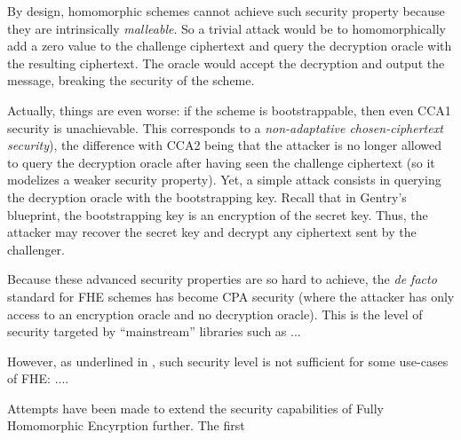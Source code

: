 By design, homomorphic schemes cannot achieve such security property because they are intrinsically \textit{malleable}. So a trivial attack would be to homomorphically add a zero value to the challenge ciphertext and query the decryption oracle with the resulting ciphertext. The oracle would accept the decryption and output the message, breaking the security of the scheme.

Actually, things are even worse: if the scheme is bootstrappable, then even \textsf{CCA1} security is unachievable. This corresponds to a \textit{non-adaptative chosen-ciphertext security}), the difference with \textsf{CCA2} being that the attacker is no longer allowed to query the decryption oracle after having seen the challenge ciphertext (so it modelizes a weaker security property). Yet, a simple attack consists in querying the decryption oracle with the bootstrapping key. Recall that in Gentry's blueprint, the bootstrapping key is an encryption of the secret key. Thus, the attacker may recover the secret key and decrypt any ciphertext sent by the challenger.


Because these advanced security properties are so hard to achieve, the \textit{de facto} standard for FHE schemes has become \textsf{CPA} security (where the attacker has only access to an encryption oracle and no decryption oracle). This is the level of security targeted by ``mainstream'' libraries such as ...

However, as underlined in \cite{bibid}, such security level is not sufficient for some use-cases of FHE: ....


Attempts have been made to extend the security capabilities of Fully Homomorphic Encyrption further. The first 


